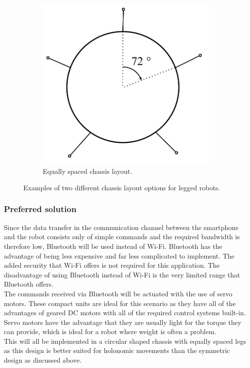 \begin{figure}[t!]
\begin{subfigure}[t]{0.5\textwidth}
        \includegraphics[scale = 0.5]{pics/Body_Layout.pdf}
        \caption{Equally spaced chassis layout.}
    \end{subfigure}
    \caption{Examples of two different chassis layout options for legged robots.}
    \label{fig:Body_layout}
\end{figure}

\subsubsection{Preferred solution}
Since the data transfer in the communication channel between the smartphone and the robot consists only of simple commands and the required bandwidth is therefore low, Bluetooth will be used instead of Wi-Fi. Bluetooth has the advantage of being less expensive and far less complicated to implement. The added security that Wi-Fi offers is not required for this application. The disadvantage of using Bluetooth instead of Wi-Fi is the very limited range that Bluetooth offers.\\

The commands received via Bluetooth will be actuated with the use of servo motors. These compact units are ideal for this scenario as they have all of the advantages of geared DC motors with all of the required control systems built-in. Servo motors have the advantage that they are usually light for the torque they can provide, which is ideal for a robot where weight is often a problem.\\

This will all be implemented in a circular shaped chassis with equally spaced legs as this design is better suited for holonomic movements than the symmetric design as discussed above.

